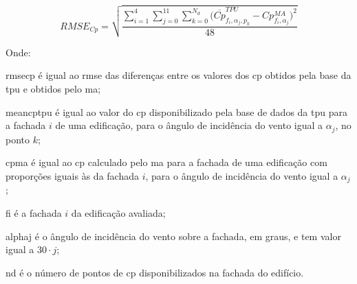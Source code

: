 \begin{equation}
\label{eq:Cpdiff}
RMSE_{Cp} = \sqrt{\frac{\sum_{i=1}^{4}{\sum_{j=0}^{11}}{\sum_{k=0}^{N_d}{(\overline{Cp}^{TPU}_{f_i,\alpha_j,p_k} - Cp^{MA}_{f_i,\alpha_j}})^2}}{48}}
\end{equation}

Onde:

\gls{rmsecp} é igual ao \acrshort{rmse} das diferenças entre os valores dos \acrshort{cp} obtidos pela base da \acrshort{tpu} e obtidos pelo \acrlong{ma};

\gls{meancptpu} é igual ao valor do \acrshort{cp} disponibilizado pela base de dados da \acrshort{tpu} para a fachada $i$ de uma edificação, para o ângulo de incidência do vento igual a $\alpha_j$, no ponto $k$;

\gls{cpma} é igual ao \acrshort{cp} calculado pelo \acrlong{ma} para a fachada de uma edificação com proporções iguais às da fachada $i$, para o ângulo de incidência do vento igual a $\alpha_j$;

\gls{fi} é a fachada $i$ da edificação avaliada;

\gls{alphaj} é o ângulo de incidência do vento  sobre a fachada, em graus, e tem valor igual a $30 \cdot j$;

\gls{nd} é o número de pontos de \acrshort{cp} disponibilizados na fachada do edifício.	
\\


